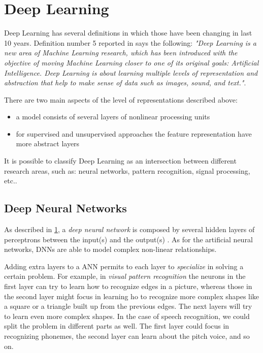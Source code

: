 \section{Deep Learning}
\label{sec:deep_learning}
Deep Learning has several definitions in which those have been changing in last 10 years. Definition number 5 reported in \cite{deng2014deep} says the following: \textit{"Deep Learning is a new area of Machine Learning research, which has been introduced with the objective of moving Machine Learning closer to one of its original goals: Artificial Intelligence. Deep Learning is about learning multiple levels of representation and abstraction that help to make sense of data such as images, sound, and text."}.

\noindent There are two main aspects of the level of representations described above:
\begin{itemize}
    \item[1)] a model consists of several layers of nonlinear processing units
    \item[2)] for supervised and unsupervised approaches the feature representation have more abstract layers
\end{itemize}
\noindent It is possible to classify Deep Learning as an intersection between different research areas, such as: neural networks, pattern recognition, signal processing, etc..\cite{deng2014deep}

\subsection{Deep Neural Networks}
As described in \ref{sec:deep_learning}, a \textit{deep neural network} is composed by several hidden layers of perceptrons between the input(s) and the output(s) \cite{bengio2009learning}. As for the artificial neural networks, DNNs are able to model complex non-linear relationships. \cite{deep_learning_wiki}

\noindent Adding extra layers to a ANN permits to each layer to \textit{specialize} in solving a certain problem. For example, in \textit{visual pattern recognition} the neurons in the first layer can try to learn how to recognize edges in a picture, whereas those in the second layer might focus in learning ho to recognize more complex shapes like a square or a triangle built up from the previous edges. The next layers will try to learn even more complex shapes. In the case of speech recognition, we could split the problem in different parts as well. The first layer could focus in recognizing phonemes, the second layer can learn about the pitch voice, and so on.

